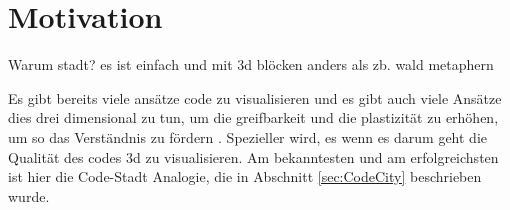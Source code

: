 \section{Motivation} \label{sec:Motivation}
Warum stadt? es ist einfach und mit 3d blöcken anders als zb. wald metaphern\cite{softwareForest}

Es gibt bereits viele ansätze code zu visualisieren und es gibt auch viele Ansätze dies drei dimensional zu tun, um die greifbarkeit und die plastizität zu erhöhen, um so das Verständnis zu fördern \cite{3dsoftwareMarcus,codeCity1,first_3D_vis,virtualButVisibleMunro}. Spezieller wird, es wenn es darum geht die Qualität des codes 3d zu visualisieren. Am bekanntesten und am erfolgreichsten ist hier die Code-Stadt Analogie, die in Abschnitt \ref{sec:CodeCity} beschrieben wurde. 